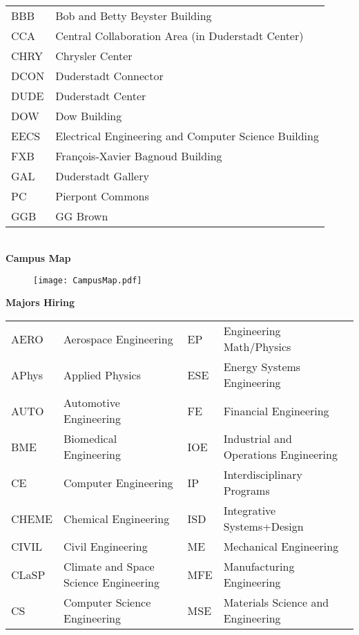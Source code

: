 { \fontsize{10}{12}\\
\begin{tabular}{p{1in}l}
BBB	&	Bob and Betty Beyster Building\\
CCA	&	Central Collaboration Area (in Duderstadt Center)\\
CHRY	&	Chrysler Center\\
DCON	&	Duderstadt Connector\\
DUDE	&	Duderstadt Center\\
DOW	&	Dow Building\\
EECS	&	Electrical Engineering and Computer Science Building\\
FXB	&	Fran\c{c}ois-Xavier Bagnoud Building\\
GAL	&	Duderstadt Gallery\\
PC	&	Pierpont Commons\\
GGB & GG Brown\\
\end{tabular}\\
{ \fontsize{20}{24}\selectfont \bf Campus Map}\\
\vspace{-1cm}
\begin{figure}[H]
\centering
\texttt{[image: CampusMap.pdf]}
\end{figure}
{ \fontsize{20}{24}\selectfont \bf Majors Hiring}\\
\begin{tabular}{p{.5in}p{2.55in}p{.5in}p{2.9in}}
AERO & Aerospace Engineering&		EP & Engineering Math/Physics\\
APhys & Applied Physics &		ESE & Energy Systems Engineering\\
AUTO& Automotive Engineering&FE&Financial Engineering\\
BME&	Biomedical Engineering& 	IOE&Industrial and Operations Engineering\\
CE & Computer Engineering&		IP&Interdisciplinary Programs\\
CHEME & Chemical Engineering&		 ISD & Integrative Systems+Design\\
CIVIL & Civil Engineering& 		ME&Mechanical Engineering\\
CLaSP & Climate and Space Science Engineering&			MFE&Manufacturing Engineering\\
CS & Computer Science Engineering&	MSE&Materials Science and Engineering\\

\end{tabular}}
